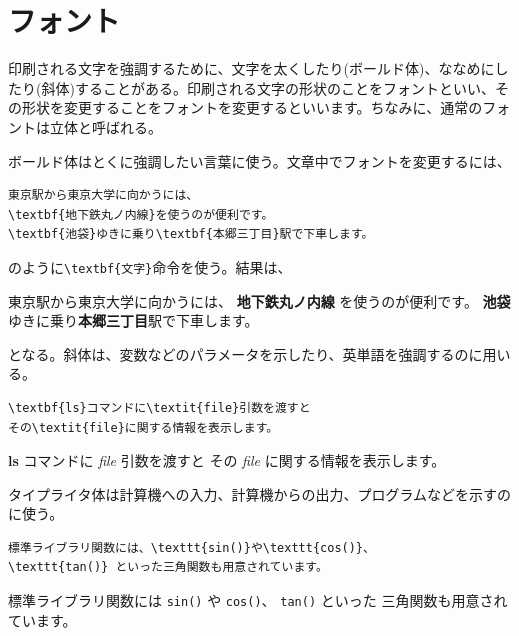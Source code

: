 \section{フォント}
\label{sec:latex:font}

印刷される文字を強調するために、文字を太くしたり(ボールド体)、ななめにしたり(斜体)することがある。印刷される文字の形状のことをフォントといい、その形状を変更することをフォントを変更するといいます。ちなみに、通常のフォントは立体と呼ばれる。

ボールド体はとくに強調したい言葉に使う。文章中でフォントを変更するには、
\begin{reidai}
\begin{verbatim}
東京駅から東京大学に向かうには、
\textbf{地下鉄丸ノ内線}を使うのが便利です。
\textbf{池袋}ゆきに乗り\textbf{本郷三丁目}駅で下車します。
\end{verbatim}
\end{reidai} \noindent
のように\verb|\textbf{文字}|命令を使う。結果は、
\begin{kekka}
東京駅から東京大学に向かうには、
\textbf{地下鉄丸ノ内線} を使うのが便利です。
\textbf{池袋}ゆきに乗り\textbf{本郷三丁目}駅で下車します。
\end{kekka} \noindent
となる。斜体は、変数などのパラメータを示したり、英単語を強調するのに用いる。
\begin{reidai}
\begin{verbatim}
\textbf{ls}コマンドに\textit{file}引数を渡すと
その\textit{file}に関する情報を表示します。
\end{verbatim}
\end{reidai}
\vspace*{-1.5em}
\begin{kekka}
\textbf{ls} コマンドに \textit{file} 引数を渡すと
その \textit{file} に関する情報を表示します。
\end{kekka} \noindent
タイプライタ体は計算機への入力、計算機からの出力、プログラムなどを示すのに使う。
\begin{reidai}
\begin{verbatim}
標準ライブラリ関数には、\texttt{sin()}や\texttt{cos()}、
\texttt{tan()} といった三角関数も用意されています。
\end{verbatim}
\end{reidai}
\vspace*{-1.5em}
\begin{kekka}
  標準ライブラリ関数には \texttt{sin()} や \texttt{cos()}、
  \texttt{tan()} といった
  三角関数も用意されています。
\end{kekka}

